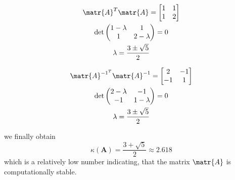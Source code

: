 \parbox{0.5\textwidth}{
\begin{gather*}
    \matr{A}^T\matr{A} = 
    \begin{bmatrix}
        1 & 1 \\
        1 & 2
    \end{bmatrix} \\
    \det\begin{pmatrix}
        1-\lambda & 1 \\
        1 & 2-\lambda
    \end{pmatrix} = 0 \\
    \lambda=\frac{3\pm\sqrt{5}}{2}
    \end{gather*}
}
\parbox{0.5\textwidth}{
\begin{gather*}
     \matr{A}^{-1^T}\matr{A}^{-1} = 
    \begin{bmatrix}
        2 & -1 \\
        -1 & 1
    \end{bmatrix} \\
    \det\begin{pmatrix}
        2-\lambda & -1 \\
        -1 & 1-\lambda
    \end{pmatrix} = 0 \\
    \lambda=\frac{3\pm\sqrt{5}}{2}
\end{gather*}
}
we finally obtain
\begin{equation*}
    \kappa(\mathbf{A})=\frac{3+\sqrt{5}}{2}\approx2.618
\end{equation*}
which is a relatively low number indicating, that the matrix $\matr{A}$ is computationally stable.
